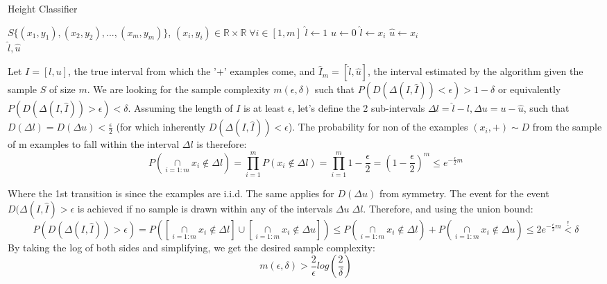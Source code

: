 \begin{algorithm}
    \caption{Height Classifier}
    \begin{algorithmic}
        \Require $S\{(x_1, y_1), (x_2, y_2), ..., (x_m, y_m)\}$, $(x_i, y_i) \in \mathbb{R} \times \mathbb{R} \; \forall i \in [1, m]$
        \State $\hat{l} \gets 1$
        \State $\hat{u} \gets 0$
                    \State $\hat{l} \gets x_i$
                \EndIf
                    \State $\hat{u} \gets x_i$
                \EndIf
            \EndIf
        \EndFor \\
    \Return $\hat{l}, \hat{u}$
    \end{algorithmic}
\end{algorithm}

Let $I = [l, u]$, the true interval from which the '+' examples come, and $\hat{I}_m = [\hat{l}, \hat{u}]$, 
the interval estimated by the algorithm given the sample $S$ of size $m$.
We are looking for the sample complexity $m(\epsilon, \delta)$ such that $P(D(\Delta(I, \hat{I})) < \epsilon) > 1-\delta$ 
or equivalently $P(D(\Delta(I, \hat{I})) > \epsilon) < \delta$.
Assuming the length of $I$ is at least $\epsilon$, let's define the 2 sub-intervals $\Delta l = \hat{l} - l, \Delta u = u - \hat{u}$, 
such that $D(\Delta l) = D(\Delta u) < \frac{\epsilon}{2}$ (for which inherently $D(\Delta(I, \hat{I})) < \epsilon$).
The probability for non of the examples $(x_i, +) \sim D$ from the sample of m examples to fall within the interval $\Delta l$ is therefore:
\begin{equation*}
    P(\underset{i=1:m}{\cap} x_i \notin \Delta l) = \prod_{i=1}^{m}P(x_i \notin \Delta l) 
    = \prod_{i=1}^{m} 1-\frac{\epsilon}{2}= (1-\frac{\epsilon}{2})^m \leq e^{-\frac{\epsilon}{2}m}
\end{equation*}

Where the 1st transition is since the examples are i.i.d. The same applies for $D(\Delta u)$ from symmetry.
The event for the event $D(\Delta(I, \hat{I}) > \epsilon$ is achieved if no sample is drawn within any of the intervals $\Delta u \; \Delta l$.
Therefore, and using the union bound:
\begin{equation*}
    P(D(\Delta(I, \hat{I})) > \epsilon) = P\left(\left[\underset{i=1:m}{\cap} x_i \notin \Delta l\right] \cup \left[\underset{i=1:m}{\cap} x_i \notin \Delta u\right]\right) 
    \leq P(\underset{i=1:m}{\cap} x_i \notin \Delta l) +  P(\underset{i=1:m}{\cap} x_i \notin \Delta u) \leq 2e^{-\frac{\epsilon}{2}m} \overset{!}{<} \delta
\end{equation*}
By taking the log of both sides and simplifying, we get the desired sample complexity:
\begin{equation*}
    m(\epsilon, \delta) > \frac{2}{\epsilon} log(\frac{2}{\delta})
\end{equation*}



